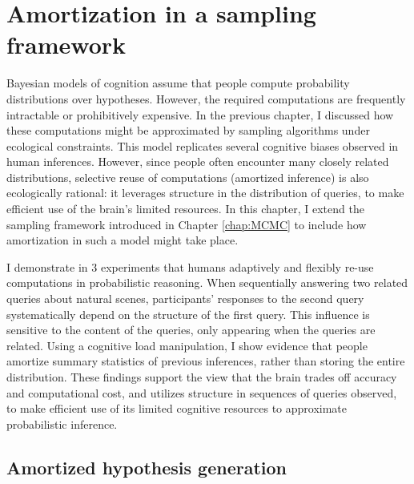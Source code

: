 
\chapter{Amortization in a sampling framework}
\label{chap:MCMC_amort}


Bayesian models of cognition assume that people compute probability distributions over hypotheses. However, the required computations are frequently intractable or prohibitively expensive. In the previous chapter, I discussed how these computations might be approximated by sampling algorithms under ecological constraints. This model replicates several cognitive biases observed in human inferences. However, since people often encounter many closely related distributions, selective reuse of computations (amortized inference) is also ecologically rational: it leverages structure in the distribution of queries, to make efficient use of the brain’s limited resources. In this chapter, I extend the sampling framework introduced in Chapter \ref{chap:MCMC} to include how amortization in such a model might take place. 

I demonstrate in 3 experiments that humans adaptively and flexibly re-use computations in probabilistic reasoning. When sequentially answering two related queries about natural scenes, participants’ responses to the second query systematically depend on the structure of the first query. This influence is sensitive to the content of the queries, only appearing when the queries are related. Using a cognitive load manipulation, I show evidence that people amortize summary statistics of previous inferences, rather than storing the entire distribution. These findings support the view that the brain trades off accuracy and computational cost, and utilizes structure in sequences of queries observed, to make efficient use of its limited cognitive resources to approximate probabilistic inference.

\section{Amortized hypothesis generation}

